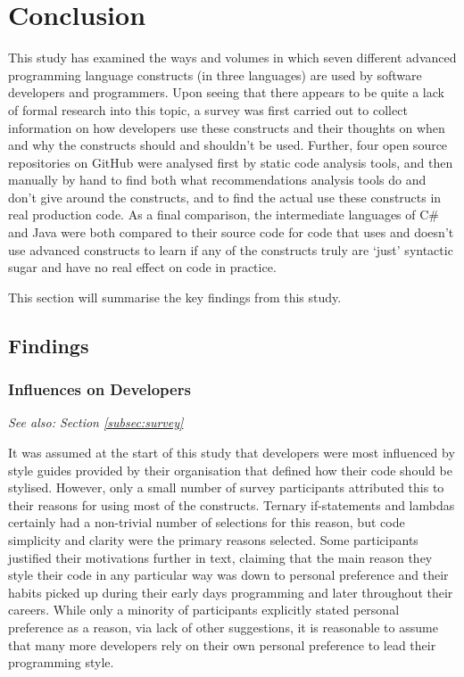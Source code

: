 \documentclass{article}
\begin{document}
\section{Conclusion}
\label{sec:conclusion}
    This study has examined the ways and volumes in which seven different advanced programming language constructs (in three languages) are used by software developers and programmers. Upon seeing that there appears to be quite a lack of formal research into this topic, a survey was first carried out to collect information on how developers use these constructs and their thoughts on when and why the constructs should and shouldn't be used. Further, four open source repositories on GitHub were analysed first by static code analysis tools, and then manually by hand to find both what recommendations analysis tools do and don't give around the constructs, and to find the actual use these constructs in real production code. As a final comparison, the intermediate languages of C\# and Java were both compared to their source code for code that uses and doesn't use advanced constructs to learn if any of the constructs truly are `just' syntactic sugar and have no real effect on code in practice.
    
    This section will summarise the key findings from this study.
    \subsection{Findings}
        \subsubsection{Influences on Developers}
            \textit{See also: Section \ref{subsec:survey}}
            \newline

            \noindent It was assumed at the start of this study that developers were most influenced by style guides provided by their organisation that defined how their code should be stylised. However, only a small number of survey participants attributed this to their reasons for using most of the constructs. Ternary if-statements and lambdas certainly had a non-trivial number of selections for this reason, but code simplicity and clarity were the primary reasons selected. Some participants justified their motivations further in text, claiming that the main reason they style their code in any particular way was down to personal preference and their habits picked up during their early days programming and later throughout their careers. While only a minority of participants explicitly stated personal preference as a reason, via lack of other suggestions, it is reasonable to assume that many more developers rely on their own personal preference to lead their programming style.
\end{document}
